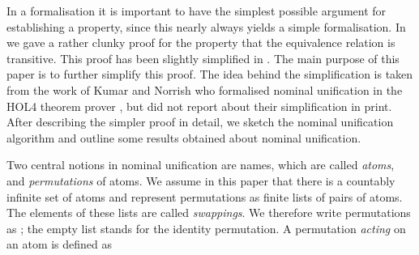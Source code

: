 \begin{isabellebody}
\begin{isamarkuptext}
  In a formalisation it is important to have the simplest possible argument
  for establishing a property, since this nearly always yields a simple
  formalisation. In \cite{UrbanPittsGabbay04} we gave a rather clunky proof
  for the property that the equivalence relation  is
  transitive. This proof has been slightly simplified in \cite{FernandezGabbay07}.  The main
  purpose of this paper is to further simplify this proof. The idea behind the
  simplification is taken from the work of Kumar and Norrish who formalised
  nominal unification in the HOL4 theorem prover \cite{KumarNorrish10}, but did
  not report about their simplification in print. After describing the simpler
  proof in detail, we sketch the nominal unification algorithm and outline
  some results obtained about nominal unification.\end{isamarkuptext}\isamarkuptrue {}
\isamarkuptrue \begin{isamarkuptext}Two central notions in nominal unification are names, which are called \emph{atoms}, and 
  \emph{permutations} of atoms.
  We assume in this paper that there is a countably infinite set of atoms and represent permutations
  as finite lists of pairs of atoms. The elements of these lists are called \emph{swappings}.
  We therefore write permutations as ; the empty list
   stands for the identity permutation. A permutation  {\it
  acting} on an atom  is defined as


\end{isamarkuptext}
\end{isabellebody}
